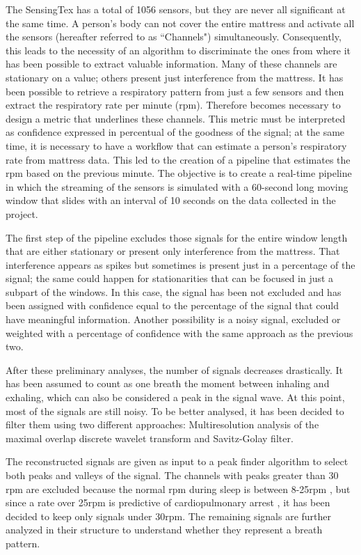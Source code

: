 The SensingTex has a total of 1056 sensors, but they are never all significant at the same time. A person's body can not cover the entire mattress and activate all the sensors (hereafter referred to as ``Channels") simultaneously. Consequently, this leads to the necessity of an algorithm to discriminate the ones from where it has been possible to extract valuable information.
Many of these channels are stationary on a value; others present just interference from the mattress. It has been possible to retrieve a respiratory pattern from just a few sensors and then extract the respiratory rate per minute (rpm). Therefore becomes necessary to design a metric that underlines these channels. 
This metric must be interpreted as confidence expressed in percentual of the goodness of the signal; at the same time, it is necessary to have a workflow that can estimate a person’s respiratory rate from mattress data. This led to the creation of a pipeline that estimates the rpm based on the previous minute. The objective is to create a real-time pipeline in which the streaming of the sensors is simulated with a 60-second long moving window that slides with an interval of 10 seconds on the data collected in the project.


The first step of the pipeline excludes those signals for the entire window length that are either stationary or present only interference from the mattress.
 That interference appears as spikes but sometimes is present just in a percentage of the signal; the same could happen for stationarities that can be focused in just a subpart of the windows. In this case, the signal has been not excluded and has been assigned with confidence equal to the percentage of the signal that could have meaningful information.
 Another possibility is a noisy signal, excluded or weighted with a percentage of confidence with the same approach as the previous two.
 
 After these preliminary analyses, the number of signals decreases drastically.
 It has been assumed to count as one breath the moment between inhaling and exhaling, which can also be considered a peak in the signal wave.
 At this point, most of the signals are still noisy. To be better analysed, it has been decided to filter them using two different approaches: Multiresolution analysis of the maximal overlap discrete wavelet transform and Savitz-Golay filter.


 The reconstructed signals are given as input to a peak finder algorithm to select both peaks and valleys of the signal. 
 The channels with peaks greater than 30 rpm are excluded because the normal rpm during sleep is between 8-25rpm \cite{Chourpiliadis2022PhysiologyRate}, but since a rate over 25rpm is predictive of cardiopulmonary arrest \cite{yuan2013respiratory}, it has been decided to keep only signals under 30rpm.
 The remaining signals are further analyzed in their structure to understand whether they represent a breath pattern.
 
